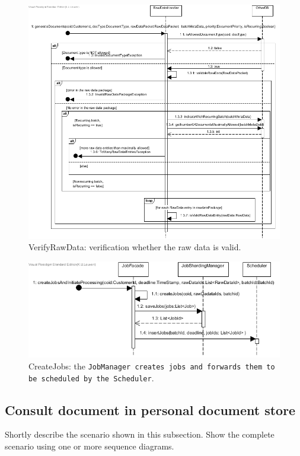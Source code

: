 \documentclass[a4paper,10pt]{article}
\begin{document}
\begin{figure}[!htp]
    \centering
    \includegraphics[width=\textwidth]{Seq_VerifyRawData.png}
    \caption{VerifyRawData: verification whether the raw data is valid.
        }\label{fig:seq_VerifyRawData}
\end{figure}

\begin{figure}[!htp]
    \centering
    \includegraphics[width=\textwidth]{Seq_CreateJobs.png}
    \caption{CreateJobs: the \texttt{JobManager creates jobs and forwards them to be scheduled by the \texttt{Scheduler}}.
        }\label{fig:seq_CreateJobs}
\end{figure}

\subsection{Consult document in personal document store}
Shortly describe the scenario shown in this subsection.
Show the complete scenario using one or more sequence diagrams.
\end{document}
